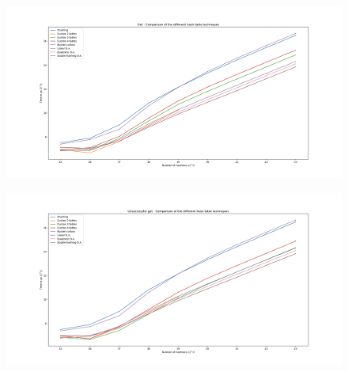 \begin{figure}[!ht]
\centering
  \includegraphics[width=\linewidth]{Chapters/HashTable/Results/DictionaryGet.png}
  \label{fig:successful_get}
 \end{figure}
 
\begin{figure}[!ht]
  \centering
  \includegraphics[width=\linewidth]{Chapters/HashTable/Results/DictionaryGetUnsuccessful.png}
  \label{fig:unsuccessful_get}
\end{figure}

